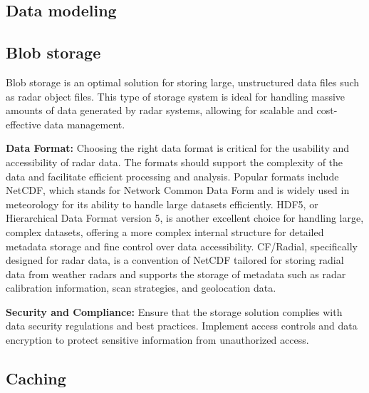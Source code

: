 
\subsection{Data modeling}

\subsection{Blob storage}

Blob storage is an optimal solution for storing large, unstructured data files
such as radar object files. This type of storage system is ideal for handling
massive amounts of data generated by radar systems, allowing for scalable and
cost-effective data management.

\textbf{Data Format:}
Choosing the right data format is critical for the usability and accessibility
of radar data. The formats should support the complexity of the data and
facilitate efficient processing and analysis. Popular formats include NetCDF,
which stands for Network Common Data Form and is widely used in meteorology for
its ability to handle large datasets efficiently. HDF5, or Hierarchical Data
Format version 5, is another excellent choice for handling large, complex
datasets, offering a more complex internal structure for detailed metadata
storage and fine control over data accessibility. CF/Radial, specifically
designed for radar data, is a convention of NetCDF tailored for storing radial
data from weather radars and supports the storage of metadata such as radar
calibration information, scan strategies, and geolocation data.

\textbf{Security and Compliance:}
Ensure that the storage solution complies with data security regulations and
best practices. Implement access controls and data encryption to protect
sensitive information from unauthorized access.

\subsection{Caching}

